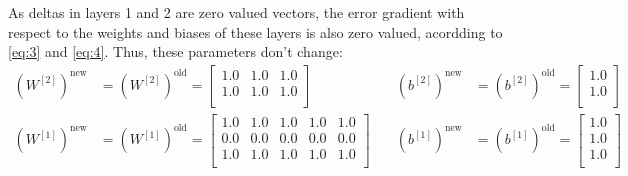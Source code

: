 \documentclass{exam}
\begin{document}
\begin{questions}
\begin{itemize}
            As deltas in layers 1 and 2 are zero valued vectors, the error gradient with respect to the weights and biases of these layers is also zero valued, acordding to \eqref{eq:3} and \eqref{eq:4}. Thus, these parameters don't change:
            \begin{equation*}
                \begin{split}
                    (W^{[2]})^{\text{new}} &= (W^{[2]})^{\text{old}} = 
                    \begin{bmatrix}
                        1.0 & 1.0 & 1.0  \\
                        1.0 & 1.0 & 1.0  \\
                    \end{bmatrix}  \\
                    (W^{[1]})^{\text{new}} &= (W^{[1]})^{\text{old}} = 
                    \begin{bmatrix}
                        1.0 & 1.0 & 1.0 & 1.0 & 1.0  \\
                        0.0 & 0.0 & 0.0 & 0.0 & 0.0  \\
                        1.0 & 1.0 & 1.0 & 1.0 & 1.0  \\
                    \end{bmatrix}
                \end{split} \quad
                \begin{split}
                    (b^{[2]})^{\text{new}} &= (b^{[2]})^{\text{old}} = 
                    \begin{bmatrix}
                        1.0  \\
                        1.0  \\
                    \end{bmatrix} \\
                    (b^{[1]})^{\text{new}} &= (b^{[1]})^{\text{old}} = 
                    \begin{bmatrix}
                        1.0  \\
                        1.0  \\
                        1.0  \\
                    \end{bmatrix}
                \end{split}
            \end{equation*}
        \end{itemize}
        \item { \; } 
            \begin{itemize}

\end{itemize}
\end{questions}
\end{document}
